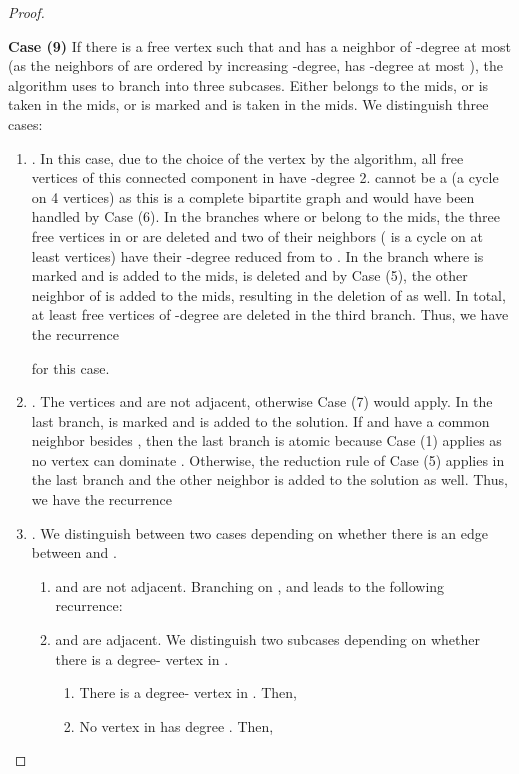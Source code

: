 \documentclass[a4paper,10pt]{article}
\theoremstyle{plain}
\theoremstyle{definition}
\theoremstyle{remark}
\newcommand{\mids}{mids\xspace}
\begin{document}
\begin{proof}
\begin{enumerate}
\end{enumerate}

{\bf Case (9)}
If there is a free vertex  such that  and  has a neighbor
of -degree at most  (as the neighbors  of  are ordered by increasing
-degree,  has -degree at most ), the algorithm uses  to branch into three subcases. 
Either  belongs to the \mids, or  is
taken in the \mids, or  is marked and  is taken in the \mids.
We distinguish three cases:
\begin{enumerate}
\item . In this case, due to the choice of the vertex 
by the algorithm, all free vertices of this connected component  in
 have -degree 2.  cannot be a  (a cycle on 4 vertices)
as this is a complete bipartite graph and would have
been handled by Case (6).
In the branches where  or  belong to the \mids, the three free vertices
in  or  are deleted and two of their neighbors ( is a cycle on
at least  vertices) have their -degree reduced from  to .
In the branch where  is marked and  is added to the \mids, 
 is deleted and by Case (5), the other neighbor  of  is
added to the \mids, resulting in the deletion of  as well. In total,
at least  free vertices of -degree  are deleted in the third branch.
Thus, we have the recurrence

for this case.

\item . The vertices  and  are not adjacent,
otherwise Case (7) would apply. In the last branch,  is marked and  is added
to the solution. If  and  have a common neighbor besides , then the last
branch is atomic because Case (1) applies as no vertex can dominate . Otherwise, the
reduction rule of Case (5) applies in the last branch and the other neighbor 
is added to the solution as well. Thus, we have the recurrence


\item . We distinguish between two cases depending on whether there 
is an edge between  and .
\begin{enumerate}
\item  and  are not adjacent. Branching on ,  and 
leads to the following recurrence:


\item  and  are adjacent. We distinguish two subcases depending on whether there is a degree- vertex in .
\begin{enumerate}
\item There is a degree- vertex in . Then,

\item No vertex in  has degree . Then,


\end{enumerate}
\end{enumerate}
\end{enumerate}
\end{proof}
\end{document}
